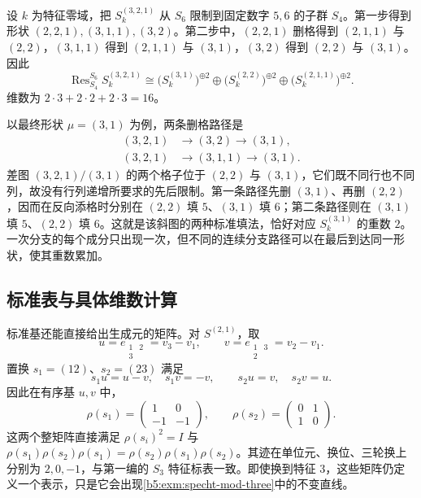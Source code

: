 \begin{example}\label{b5:exm:iterated-branch-321}
	设 \(k\) 为特征零域，把 \(S_k^{(3,2,1)}\) 从 \(S_6\) 限制到固定数字 \(5,6\) 的子群 \(S_4\)。第一步得到形状 \((2,2,1),(3,1,1),(3,2)\)。第二步中，\((2,2,1)\) 删格得到 \((2,1,1)\) 与 \((2,2)\)，\((3,1,1)\) 得到 \((2,1,1)\) 与 \((3,1)\)，\((3,2)\) 得到 \((2,2)\) 与 \((3,1)\)。因此
	\[
		\operatorname{Res}_{S_4}^{S_6}S_k^{(3,2,1)} \cong \bigl(S_k^{(3,1)}\bigr)^{\oplus2} \oplus\bigl(S_k^{(2,2)}\bigr)^{\oplus2} \oplus\bigl(S_k^{(2,1,1)}\bigr)^{\oplus2}.
	\]
	维数为 \(2\cdot3+2\cdot2+2\cdot3=16\)。

	以最终形状 \(\mu=(3,1)\) 为例，两条删格路径是
	\[
		\begin{aligned}
			(3,2,1)&\longrightarrow(3,2)\longrightarrow(3,1),\\
			(3,2,1)&\longrightarrow(3,1,1)\longrightarrow(3,1).
		\end{aligned}
	\]
	差图 \((3,2,1)/(3,1)\) 的两个格子位于 \((2,2)\) 与 \((3,1)\)，它们既不同行也不同列，故没有行列递增所要求的先后限制。第一条路径先删 \((3,1)\)、再删 \((2,2)\)，因而在反向添格时分别在 \((2,2)\) 填 \(5\)、\((3,1)\) 填 \(6\)；第二条路径则在 \((3,1)\) 填 \(5\)、\((2,2)\) 填 \(6\)。这就是该斜图的两种标准填法，恰好对应 \(S_k^{(3,1)}\) 的重数 \(2\)。一次分支的每个成分只出现一次，但不同的连续分支路径可以在最后到达同一形状，使其重数累加。
\end{example}

\subsection{标准表与具体维数计算}
\label{b5:subsec:0606:03}

标准基还能直接给出生成元的矩阵。对 \(S^{(2,1)}\)，取
\[
	u=e_{\begin{smallmatrix}1&2\\3&\end{smallmatrix}}=v_3-v_1,
	\qquad
	v=e_{\begin{smallmatrix}1&3\\2&\end{smallmatrix}}=v_2-v_1.
\]
置换 \(s_1=(12)\)、\(s_2=(23)\) 满足
\[
	s_1u=u-v,\quad s_1v=-v,\qquad s_2u=v,\quad s_2v=u.
\]
因此在有序基 \(u,v\) 中，
\[
	\rho(s_1)=
	\begin{pmatrix}1&0\\-1&-1\end{pmatrix},
	\qquad \rho(s_2)=
	\begin{pmatrix}0&1\\1&0\end{pmatrix}.
\]
这两个整矩阵直接满足 \(\rho(s_i)^2=I\) 与 \(\rho(s_1)\rho(s_2)\rho(s_1)= \rho(s_2)\rho(s_1)\rho(s_2)\)。其迹在单位元、换位、三轮换上分别为 \(2,0,-1\)，与第一编的 \(S_3\) 特征标表一致。即使换到特征 \(3\)，这些矩阵仍定义一个表示，只是它会出现\cref{b5:exm:specht-mod-three}中的不变直线。

